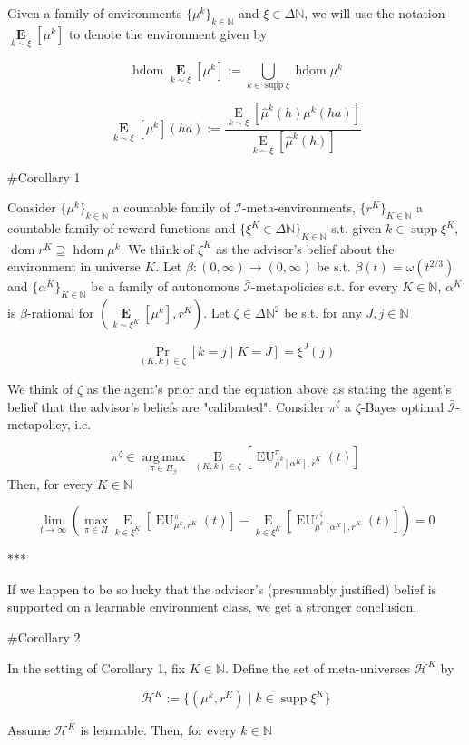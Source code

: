 \documentclass[a4paper]{article}
\DeclareMathOperator{\Supp}{supp}
\DeclareMathOperator{\Dom}{dom}
\newcommand{\E}[1]{\underset{#1}{\operatorname{E}}}
\newcommand{\Argmax}[1]{\underset{#1}{\operatorname{arg\,max}}\,}
\newcommand{\Nats}{\mathbb{N}}
\newcommand{\I}{\mathcal{I}}
\newcommand{\Adi}{\bar{\I}}
\DeclareMathOperator{\HD}{hdom}
\newcommand{\Hy}{\mathcal{H}}
\newcommand{\EU}{\operatorname{EU}}
\newcommand{\BE}[1]{\underset{#1}{\boldsymbol{\operatorname{E}}}}
\begin{document}
Given a family of environments $\{\mu^k\}_{k \in \Nats}$ and $\xi \in \Delta\Nats$, we will use the notation $\BE{k \sim \xi}[\mu^k]$ to denote the environment given by

$$\HD{\BE{k \sim \xi}[\mu^k]}:= \bigcup_{k \in \Supp \xi} \HD{\mu^k}$$

$$\BE{k \sim \xi}[\mu^k](ha):=\frac{\E{k \sim \xi}[ \hat{\mu}^k(h)\mu^k(ha)]}{\E{k \sim \xi}[ \hat{\mu}^k(h)]}$$

\#Corollary 1

Consider $\{\mu^k\}_{k \in \Nats}$ a countable family of $\I$-meta-environments, $\{r^K\}_{K \in \Nats}$ a countable family of reward functions and $\{\xi^K \in \Delta\Nats\}_{K \in \Nats}$ s.t. given $k \in \Supp \xi^K$, $\Dom{r^K} \supseteq \HD{\mu^k}$. We think of $\xi^K$ as the advisor's belief about the environment in universe $K$. Let $\beta: (0,\infty) \rightarrow (0,\infty)$ be s.t. $\beta(t) = \omega(t^{2/3})$ and $\{\alpha^K\}_{K \in \Nats}$ be a family of autonomous $\Adi$-metapolicies s.t. for every $K \in \Nats$, $\alpha^K$ is $\beta$-rational for $(\BE{k \sim \xi^K}[\mu^k], r^K)$. Let $\zeta \in \Delta\Nats^2$ be s.t. for any $J,j \in \Nats$ 

$$\Pr_{(K,k) \in \zeta}[k = j \mid K = J] = \xi^J(j)$$ 

We think of $\zeta$ as the agent's prior and the equation above as stating the agent's belief that the advisor's beliefs are "calibrated". Consider $\pi^\zeta$ a $\zeta$-Bayes optimal $\Adi$-metapolicy, i.e.

$$\pi^\zeta \in \Argmax{\pi \in \Pi_{\Adi}}{\E{(K,k) \in \zeta}[\EU_{\bar{\mu}^k[\alpha^K],\bar{r}^K}^\pi(t)]}$$ 
Then, for every $K \in \Nats$

$$\lim_{t \rightarrow \infty} (\max_{\pi \in \Pi} \E{k \in \xi^K}[\EU_{\mu^k,r^K}^\pi(t)] - \E{k \in \xi^K}[\EU_{\bar{\mu}^k[\alpha^K],\bar{r}^K}^{\pi^\zeta}(t)]) = 0$$

***

If we happen to be so lucky that the advisor's (presumably justified) belief is supported on a learnable environment class, we get a stronger conclusion.

\#Corollary 2

In the setting of Corollary 1, fix $K \in \Nats$. Define the set of meta-universes $\Hy^K$ by

$$\Hy^K:= \{(\mu^k, r^K) \mid k \in \Supp \xi^K\}$$

Assume $\Hy^K$ is learnable. Then, for every $k \in \Nats$
\end{document}
